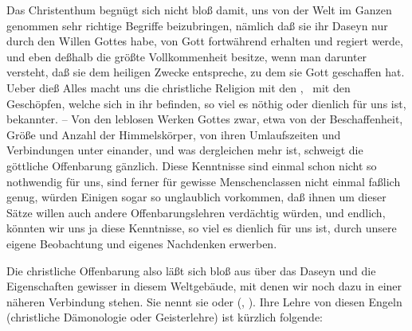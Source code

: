 Das Christenthum begnügt sich nicht bloß damit, uns von der Welt im Ganzen genommen sehr richtige Begriffe beizubringen, nämlich daß sie ihr Daseyn nur durch den Willen Gottes habe, von Gott fortwährend erhalten und regiert werde, und eben deßhalb die größte Vollkommenheit besitze, wenn man darunter versteht, daß sie dem heiligen Zwecke entspreche, zu dem sie Gott geschaffen hat. Ueber dieß Alles macht uns die christliche Religion mit den , \dh\ mit den Geschöpfen, welche sich in ihr befinden, so viel es nöthig oder dienlich für uns ist, bekannter. -- Von den leblosen Werken Gottes zwar, etwa von der Beschaffenheit, Größe und Anzahl der Himmelskörper, von ihren Umlaufszeiten und Verbindungen unter einander, und was dergleichen mehr ist, schweigt die göttliche Offenbarung gänzlich. Diese Kenntnisse sind einmal schon nicht so nothwendig für uns, sind ferner für gewisse Menschenclassen nicht einmal faßlich genug, würden Einigen sogar so unglaublich vorkommen, daß ihnen um dieser Sätze willen auch andere Offenbarungslehren verdächtig würden, und endlich, könnten wir uns ja diese Kenntnisse, so viel es dienlich für uns ist, durch unsere eigene Beobachtung und eigenes Nachdenken erwerben.\par
Die christliche Offenbarung also läßt sich bloß aus über das Daseyn und die Eigenschaften gewisser  in diesem Weltgebäude, mit denen wir noch dazu in einer näheren Verbindung stehen. Sie nennt sie  oder  (, ). Ihre Lehre von diesen Engeln (christliche Dämonologie oder Geisterlehre) ist kürzlich folgende:
